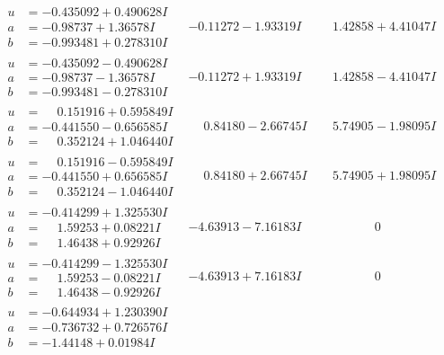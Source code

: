 \documentclass[1p]{elsarticle_modified}
\theoremstyle{definition}
\begin{document}
$$\begin{array}{c|c|c}
\begin{aligned}
u &= -0.435092 + 0.490628 I \\
a &= -0.98737 + 1.36578 I \\
b &= -0.993481 + 0.278310 I\end{aligned}
 & -0.11272 - 1.93319 I & \phantom{-}1.42858 + 4.41047 I \\ \hline\begin{aligned}
u &= -0.435092 - 0.490628 I \\
a &= -0.98737 - 1.36578 I \\
b &= -0.993481 - 0.278310 I\end{aligned}
 & -0.11272 + 1.93319 I & \phantom{-}1.42858 - 4.41047 I \\ \hline\begin{aligned}
u &= \phantom{-}0.151916 + 0.595849 I \\
a &= -0.441550 - 0.656585 I \\
b &= \phantom{-}0.352124 + 1.046440 I\end{aligned}
 & \phantom{-}0.84180 - 2.66745 I & \phantom{-}5.74905 - 1.98095 I \\ \hline\begin{aligned}
u &= \phantom{-}0.151916 - 0.595849 I \\
a &= -0.441550 + 0.656585 I \\
b &= \phantom{-}0.352124 - 1.046440 I\end{aligned}
 & \phantom{-}0.84180 + 2.66745 I & \phantom{-}5.74905 + 1.98095 I \\ \hline\begin{aligned}
u &= -0.414299 + 1.325530 I \\
a &= \phantom{-}1.59253 + 0.08221 I \\
b &= \phantom{-}1.46438 + 0.92926 I\end{aligned}
 & -4.63913 - 7.16183 I & \phantom{-0.000000 } 0 \\ \hline\begin{aligned}
u &= -0.414299 - 1.325530 I \\
a &= \phantom{-}1.59253 - 0.08221 I \\
b &= \phantom{-}1.46438 - 0.92926 I\end{aligned}
 & -4.63913 + 7.16183 I & \phantom{-0.000000 } 0 \\ \hline\begin{aligned}
u &= -0.644934 + 1.230390 I \\
a &= -0.736732 + 0.726576 I \\
b &= -1.44148 + 0.01984 I\end{aligned}

\end{array}$$
\end{document}
